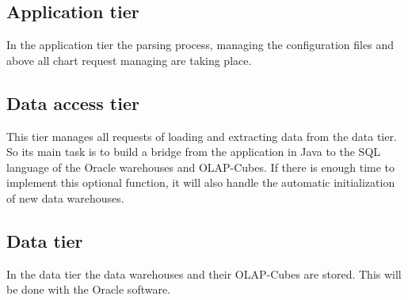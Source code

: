 \subsection{Application tier}
In the application tier the parsing process, managing the configuration files and above all 
chart request managing are taking place. 

\subsection{Data access tier}
This tier manages all requests of loading and extracting data from the data tier. So its main task is
to build a bridge from the application in Java to the SQL language of the Oracle warehouses and OLAP-Cubes.
If there is enough time to implement this optional function, it will also handle 
the automatic initialization of new data warehouses.  

\subsection{Data tier}
In the data tier the data warehouses and their OLAP-Cubes are stored. 
This will be done with the Oracle software.   
